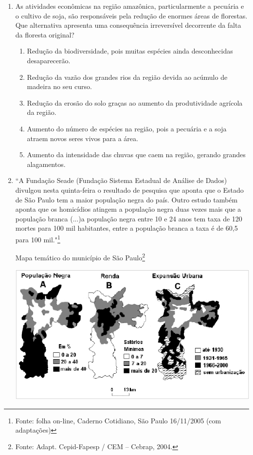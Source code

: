 \documentclass[10pt,a4paper]{article}
\newenvironment{Figure}
  {\par\medskip\noindent\minipage{\linewidth}}
  {\endminipage\par\medskip}
\begin{document}
\begin{multicols}{2}
\begin{enumerate}
	\item As atividades econ\^omicas na regi\~ao amaz\^onica, particularmente a pecu\'aria e o cultivo de soja, s\~ao respons\'aveis pela redu\c{c}\~ao de enormes \'areas de florestas. Que alternativa apresenta uma consequ\^encia irrevers\'ivel decorrente da falta da floresta original?
		\begin{enumerate}
		\item Redu\c{c}\~ao da biodiversidade, pois muitas esp\'ecies ainda desconhecidas desaparecer\~ao. 
		\item Redu\c{c}\~ao da vaz\~ao dos grandes rios da regi\~ao devida ao ac\'umulo de madeira no seu curso.
		\item Redu\c{c}\~ao da eros\~ao do solo gra\c{c}as ao aumento da produtividade agr\'icola da regi\~ao.
		\item Aumento do n\'umero de esp\'ecies na regi\~ao, pois a pecu\'aria e a soja atraem novos seres vivos para a \'area.
		\item Aumento da intensidade das chuvas que caem na regi\~ao, gerando grandes alagamentos.
		\end{enumerate}

	\item ``A Funda\c{c}\~ao Seade (Funda\c{c}\~ao Sistema Estadual de An\'alise de Dados) divulgou nesta quinta-feira o resultado de pesquisa que aponta que o Estado de S\~ao Paulo tem a maior popula\c{c}\~ao negra do pa\'is. Outro estudo tamb\'em aponta que os homic\'idios atingem a popula\c{c}\~ao negra duas vezes mais que a popula\c{c}\~ao branca (...)a popula\c{c}\~ao negra entre 10 e 24 anos tem taxa de 120 mortes para 100 mil habitantes, entre a popula\c{c}\~ao branca a taxa \'e de 60,5 para 100 mil."\footnote{Fonte: folha on-line, Caderno Cotidiano, S\~ao Paulo 16/11/2005 (com adapta\c{c}ões)}

Mapa tem\'atico do munic\'ipio de S\~ao Paulo\footnote{Fonte: Adapt. Cepid-Fapesp / CEM – Cebrap, 2004.}

\begin{Figure}
     \includegraphics[width=\linewidth]{mapa_tematico_geografia.jpg}
\end{Figure}


\end{enumerate}
\end{multicols}
\end{document}
